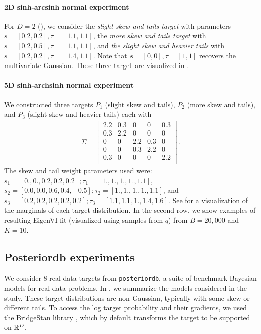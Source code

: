 \paragraph{2D sinh-arcsinh normal experiment}
For $D=2$ (), we consider the
\emph{slight skew and tails target} with parameters
$s=[0.2,0.2], \tau = [1.1,1.1]$,
the \emph{more skew and tails target} with
$s=[0.2,0.5], \tau = [1.1,1.1]$,
and \emph{the slight skew and heavier tails} with
$s=[0.2,0.2], \tau = [1.4,1.1]$.
Note that $s=[0,0], \tau=[1,1]$ recovers the multivariate Gaussian.
%
These three target are visualized in
.

\paragraph{5D sinh-archsinh normal experiment}


We constructed three targets $P_1$ (slight skew and tails), $P_2$ (more skew and tails),
and $P_3$ (slight skew and heavier tails) each with
\begin{align}
    \Sigma =
\begin{bmatrix}
    2.2 & 0.3 & 0   & 0   & 0.3 \\
    0.3 & 2.2 & 0   & 0   & 0 \\
    0   & 0   & 2.2 & 0.3 & 0 \\
    0   & 0   & 0.3 & 2.2 & 0 \\
    0.3 & 0   & 0   & 0   & 2.2 \\
\end{bmatrix}.
\end{align}
The skew and tail weight parameters used were:
$s_1 = [0.,0.,0.2,0.2,0.2]; \tau_1 = [1., 1., 1., 1., 1.1]$,
$s_2 = [0.0,0.0,0.6,0.4,-0.5]; \tau_2 = [1., 1., 1., 1., 1.1]$,
and
$s_3 = [0.2,0.2,0.2,0.2,0.2]; \tau_3 = [1.1, 1.1, 1., 1.4, 1.6]$.
See  for a visualization of the marginals of each target distribution.
In the second row, we show examples of resulting EigenVI fit (visualized using samples from $q$)
from $B=20{,}000$ and $K=10$.


\subsection{Posteriordb experiments}
\label{ssec:pdb}

We consider 8 real data targets from \texttt{posteriordb}, a suite of benchmark
Bayesian models for real data problems.
In , we summarize the models considered in the study.
These target distributions are non-Gaussian, typically with some skew or different tails.
To access the log target probability and their gradients, we used the
BridgeStan library \citep{roualdes2023bridgestan}, which by default transforms the target
to be supported on $\mathbb{R}^D$.

